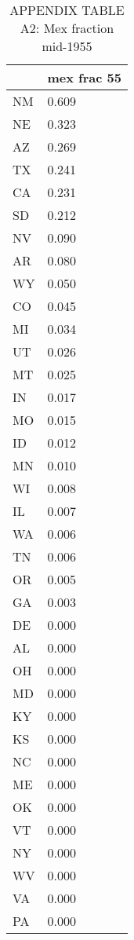 \begin{table}[htbp]
\caption{\label{clabel} APPENDIX TABLE A2: Mex fraction mid-1955}\centering\medskip
\begin{tabular}{|l|l|}\hline  
 & mex frac 55  \\ \hline  
NM & 0.609 \\ \hline 
NE & 0.323 \\ \hline 
AZ & 0.269 \\ \hline 
TX & 0.241 \\ \hline 
CA & 0.231 \\ \hline 
SD & 0.212 \\ \hline 
NV & 0.090 \\ \hline 
AR & 0.080 \\ \hline 
WY & 0.050 \\ \hline 
CO & 0.045 \\ \hline 
MI & 0.034 \\ \hline 
UT & 0.026 \\ \hline 
MT & 0.025 \\ \hline 
IN & 0.017 \\ \hline 
MO & 0.015 \\ \hline 
ID & 0.012 \\ \hline 
MN & 0.010 \\ \hline 
WI & 0.008 \\ \hline 
IL & 0.007 \\ \hline 
WA & 0.006 \\ \hline 
TN & 0.006 \\ \hline 
OR & 0.005 \\ \hline 
GA & 0.003 \\ \hline 
DE & 0.000 \\ \hline 
AL & 0.000 \\ \hline 
OH & 0.000 \\ \hline 
MD & 0.000 \\ \hline 
KY & 0.000 \\ \hline 
KS & 0.000 \\ \hline 
NC & 0.000 \\ \hline 
ME & 0.000 \\ \hline 
OK & 0.000 \\ \hline 
VT & 0.000 \\ \hline 
NY & 0.000 \\ \hline 
WV & 0.000 \\ \hline 
VA & 0.000 \\ \hline 
PA & 0.000 \\ \hline 

\end{tabular}
\end{table}
